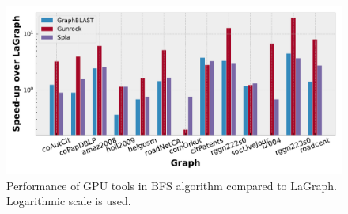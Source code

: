 




\begin{figure}[]
\centering
\includegraphics[width=0.95\linewidth]{plots/rq1_rel_bfs.pdf}
\caption{Performance of GPU tools in BFS algorithm compared to LaGraph. Logarithmic scale is used.}
\label{fig:rq1_bfs}
\end{figure}

